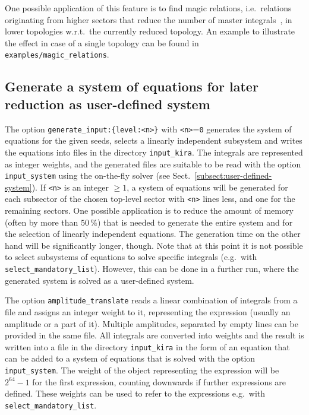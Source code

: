 \documentclass[11pt,a4paper,DIV=11,numbers=noenddot,parskip=half]{scrartcl}
\newcommand{\code}[1]{\texttt{#1}}
\begin{document}
One possible application of this feature is to find magic relations, i.e.\ relations originating from higher sectors that reduce the number of master integrals~\cite{Frellesvig:2018ymi}, in lower topologies w.r.t.\ the currently reduced topology.
An example to illustrate the effect in case of a single topology can be found in \code{examples/magic\_relations}.


\subsection{Generate a system of equations for later reduction as user-defined system}
\label{sect:generate_input}

The option \code{generate\_input:\;\{level:\;<n>\}} with \code{<n>}=\code{0} generates the system of equations for the given seeds, selects a linearly independent subsystem and writes the equations into files in the directory \code{input\_kira}.
The integrals are represented as integer weights, and the generated files are suitable to be read with the option \code{input\_system} using the on-the-fly solver (see Sect.~\ref{subsect:user-defined-system}).
If \code{<n>} is an integer $\ge 1$, a system of equations will be generated for each subsector of the chosen top-level sector with \code{<n>} lines less,
and one for the remaining sectors.
One possible application is to reduce the amount of memory (often by more than $50\,\%$) that is needed to generate the entire system and for the selection of linearly independent equations.
The generation time on the other hand will be significantly longer, though.
Note that at this point it is not possible to select subsystems of equations to solve specific integrals (e.g.\ with \code{select\_mandatory\_list}).
However, this can be done in a further run, where the generated system is solved as a user-defined system.

The option \code{amplitude\_translate} reads a linear combination of integrals from a file and assigns an integer weight to it, representing the expression (usually an amplitude or a part of it).
Multiple amplitudes, separated by empty lines can be provided in the same file.
All integrals are converted into weights and the result is written into a file in the directory \code{input\_kira} in the form of an equation that can be added to a system of equations that is solved with the option \code{input\_system}.
The weight of the object representing the expression will be $2^{64}-1$ for the first expression, counting downwards if further expressions are defined.
These weights can be used to refer to the expressions e.g.\ with \code{select\_mandatory\_list}.
\end{document}
